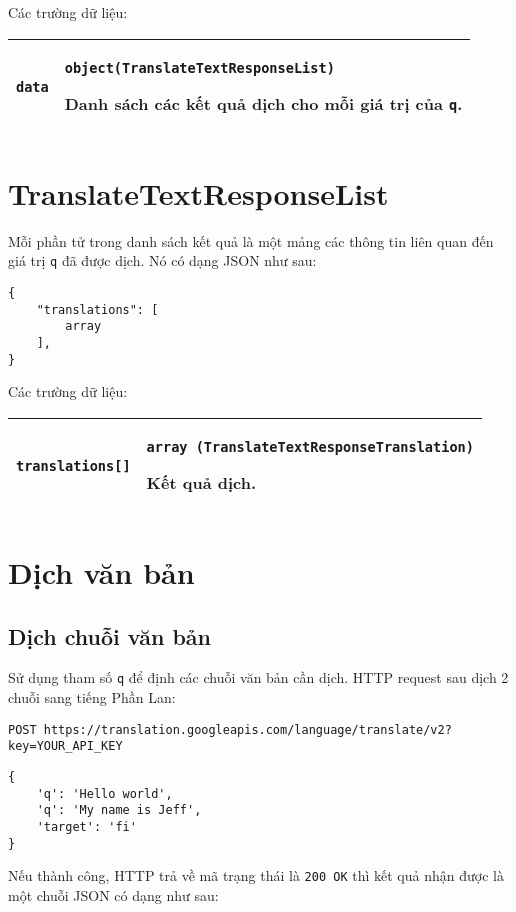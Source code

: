 \documentclass[../thesis.tex]{subfiles}
\begin{document}
Các trường dữ liệu:
\begin{center}
\begin{tabularx}{\textwidth}{|p{}|X|}
\hline
\lstinline{data} & \lstinline{object(TranslateTextResponseList)}

Danh sách các kết quả dịch cho mỗi giá trị của \lstinline{q}.\\
\hline
\end{tabularx}
\end{center}

\section{TranslateTextResponseList}
Mỗi phần tử trong danh sách kết quả là một mảng các thông tin liên quan đến giá trị \lstinline{q} đã được dịch. Nó có dạng JSON như sau:

\begin{lstlisting}[style=link]
{
	"translations": [
		array
	],
}
\end{lstlisting}

Các trường dữ liệu:
\begin{center}
\begin{tabularx}{\textwidth}{|p{}|X|}
\hline
\lstinline{translations[]} & \lstinline{array (TranslateTextResponseTranslation)}

Kết quả dịch.\\
\hline
\end{tabularx}
\end{center}

\section{Dịch văn bản}
\subsection{Dịch chuỗi văn bản}
Sử dụng tham số \lstinline{q} để định các chuỗi văn bản cần dịch. HTTP request sau dịch 2 chuỗi sang tiếng Phần Lan:
\begin{lstlisting}[style=link]
 POST https://translation.googleapis.com/language/translate/v2?key=YOUR_API_KEY
\end{lstlisting}
\begin{lstlisting}[style=link]
{
	'q': 'Hello world',
	'q': 'My name is Jeff',
	'target': 'fi'
}
\end{lstlisting}

Nếu thành công, HTTP trả về mã trạng thái là \lstinline{200 OK} thì kết quả nhận được là một chuỗi JSON có dạng như sau:
\end{document}
